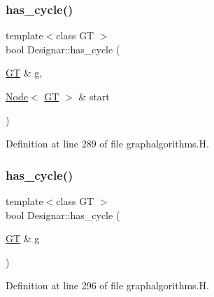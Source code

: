 \subsubsection{\texorpdfstring{has\+\_\+cycle()}{has\_cycle()}\hspace{0.1cm}{\footnotesize\ttfamily [1/2]}}
{\footnotesize\ttfamily template$<$class GT $>$ \\
bool Designar\+::has\+\_\+cycle (\begin{DoxyParamCaption}\item[{\hyperlink{demo-buildgraph_8_c_a3001c40d2c31ca87ed96cd7d1334a55e}{GT} \&}]{g,  }\item[{\hyperlink{namespace_designar_a5af326c65aa2bd26b26c410f2030d09e}{Node}$<$ \hyperlink{demo-buildgraph_8_c_a3001c40d2c31ca87ed96cd7d1334a55e}{GT} $>$ \&}]{start }\end{DoxyParamCaption})}



Definition at line 289 of file graphalgorithms.\+H.

\mbox{\label{namespace_designar_a4b250ae7cdab37b1a1489179266ef5d6}} 
\subsubsection{\texorpdfstring{has\+\_\+cycle()}{has\_cycle()}\hspace{0.1cm}{\footnotesize\ttfamily [2/2]}}
{\footnotesize\ttfamily template$<$class GT $>$ \\
bool Designar\+::has\+\_\+cycle (\begin{DoxyParamCaption}\item[{\hyperlink{demo-buildgraph_8_c_a3001c40d2c31ca87ed96cd7d1334a55e}{GT} \&}]{g }\end{DoxyParamCaption})}



Definition at line 296 of file graphalgorithms.\+H.

\mbox{\label{namespace_designar_a696580cb9bbe71161e0e3ffa27c95157}} 
